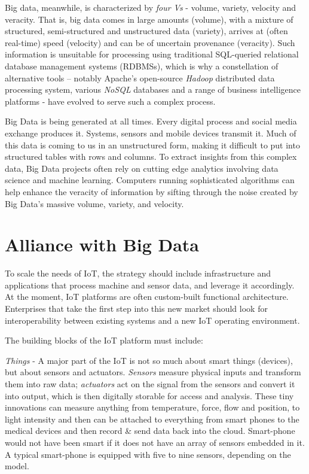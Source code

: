 \documentclass[sigconf]{acmart}
\begin{document}
Big data, meanwhile, is characterized by {\em four Vs} - volume, variety, velocity and veracity\cite{3_wiki_bigdata}. That is, big data comes in large amounts (volume), with a mixture of structured, semi-structured and unstructured data (variety), arrives at (often real-time) speed (velocity) and can be of uncertain provenance (veracity). Such information is unsuitable for processing using traditional SQL-queried relational database management systems (RDBMSs), which is why a constellation of alternative tools -- notably Apache's open-source {\em Hadoop} distributed data processing system, various {\em NoSQL} databases and a range of business intelligence platforms - have evolved to serve such a complex process.

Big Data is being generated at all times. Every digital process and social media exchange produces it. Systems, sensors and mobile devices transmit it. Much of this data is coming to us in an unstructured form, making it difficult to put into structured tables with rows and columns. To extract insights from this complex data, Big Data projects often rely on cutting edge analytics involving data science and machine learning. Computers running sophisticated algorithms can help enhance the veracity of information by sifting through the noise created by Big Data's massive volume, variety, and velocity.

\section{Alliance with Big Data}

To scale the needs of IoT, the strategy should include infrastructure and applications that process machine and sensor data, and leverage it accordingly. At the moment, IoT platforms are often custom-built functional architecture. Enterprises that take the first step into this new market should look for interoperability between existing systems and a new IoT operating environment.

The building blocks of the IoT platform must include:

{\em Things} -  A major part of the IoT is not so much about smart things (devices), but about sensors and actuators. {\em Sensors} measure physical inputs and transform them into raw data; {\em actuators} act on the signal from the sensors and convert it into output, which is then digitally storable for access and analysis.  These tiny innovations can measure anything from temperature, force, flow and position, to light intensity and then can be attached to everything from smart phones to the medical devices and then record \& send data back into the cloud. Smart-phone would not have been smart if it does not have an array of sensors embedded in it\cite{4_Wiley_Book}. A typical smart-phone is equipped with five to nine sensors, depending on the model. 
\end{document}
